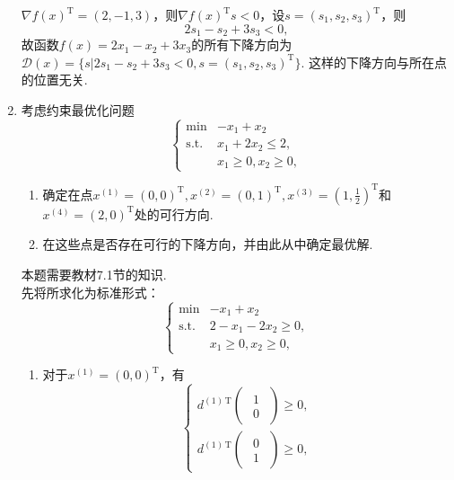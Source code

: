 \begin{enumerate}
    \sol $\displaystyle \nabla f(x)^{\mathrm{T}}=(2,-1,3)$，则$\nabla f(x)^{\mathrm{T}} s < 0$，设$s=(s_1,s_2,s_3)^{\mathrm{T}}$，则\[2s_1-s_2+3s_3 < 0,\]
    故函数$f(x)=2x_1-x_2+3x_3$的所有下降方向为$\mathcal{D}(x)=\{s | 2s_1-s_2+3s_3 < 0, s=(s_1,s_2,s_3)^{\mathrm{T}}\}$. 这样的下降方向与所在点的位置无关.
    \item 考虑约束最优化问题\[\begin{cases}
        \min & -x_1+x_2\\
        \mathrm{s.t.} & x_1+2x_2 \leqslant 2,\\
        & x_1 \geqslant 0, x_2 \geqslant 0,
    \end{cases}\]
    \begin{enumerate}[label=(\arabic*)]
        \item 确定在点$\displaystyle x^{(1)}=(0,0)^{\mathrm{T}},x^{(2)}=(0,1)^{\mathrm{T}},x^{(3)}=\left(1,\frac{1}{2}\right)^{\mathrm{T}}$和$x^{(4)}=(2,0)^{\mathrm{T}}$处的可行方向.
        \item 在这些点是否存在可行的下降方向，并由此从中确定最优解.
    \end{enumerate}
    \sol 本题需要教材7.1节的知识.\\
    先将所求化为标准形式：
    \[\begin{cases}
        \min & -x_1+x_2\\
        \mathrm{s.t.} & 2-x_1-2x_2 \geqslant 0,\\
        & x_1 \geqslant 0, x_2 \geqslant 0,
    \end{cases}\]
    \begin{enumerate}[label=(\arabic*)]
        \item 对于$x^{(1)}=(0,0)^{\mathrm{T}}$，有
        \[\begin{cases}
            d^{(1)\,\mathrm{T}} \left(\begin{array}{cc}
                \begin{matrix}
                    1\\0
                \end{matrix}
            \end{array}\right) \geqslant 0,\\
            d^{(1)\,\mathrm{T}} \left(\begin{array}{cc}
                \begin{matrix}
                    0\\1
                \end{matrix}
            \end{array}\right) \geqslant 0,

\end{cases}\]
\end{enumerate}
\end{enumerate}
